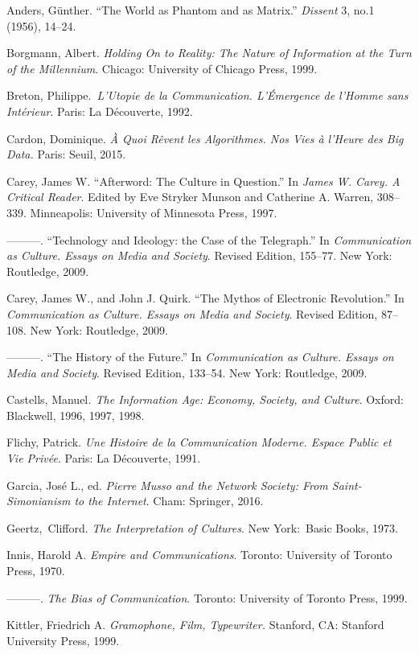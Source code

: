 \documentclass{tufte-handout}
\begin{document}
\begin{hangparas}{.25in}{1} 



Anders, Günther. ``The World as Phantom and as Matrix.'' \emph{Dissent}
3, no.1 (1956), 14--24.

Borgmann, Albert. \emph{Holding On to Reality: The Nature of Information
at the Turn of the Millennium}. Chicago: University of Chicago Press,
1999.

Breton, Philippe.~\emph{L'Utopie de la Communication. L'Émergence de
l'Homme sans Intérieur}. Paris: La Découverte, 1992.

Cardon, Dominique. \emph{À Quoi Rêvent les Algorithmes. Nos Vies à
l'Heure des Big Data.} Paris: Seuil, 2015.

Carey, James W. ``Afterword: The Culture in Question.'' In \emph{James
W. Carey. A Critical Reader}. Edited by Eve Stryker Munson and Catherine
A. Warren, 308--339. Minneapolis: University of Minnesota Press, 1997.

---------. ``Technology and Ideology: the Case of the Telegraph.'' In
\emph{Communication as Culture. Essays on Media and Society}. Revised
Edition, 155--77. New York: Routledge, 2009.

Carey, James W., and John J. Quirk. ``The Mythos of Electronic
Revolution.'' In \emph{Communication as Culture. Essays on Media and
Society}. Revised Edition, 87--108. New York: Routledge, 2009.

---------. ``The History of the Future.'' In \emph{Communication as
Culture. Essays on Media and Society}. Revised Edition, 133--54. New
York: Routledge, 2009.

Castells, Manuel\emph{. The Information Age: Economy, Society, and
Culture}. Oxford: Blackwell, 1996, 1997, 1998.

Flichy, Patrick. \emph{Une Histoire de la Communication Moderne. Espace
Public et Vie Privée}. Paris: La Découverte, 1991.

Garcia, José L., ed. \emph{Pierre Musso and the Network Society: From
Saint-Simonianism to the Internet}. Cham: Springer, 2016.

Geertz,~Clifford. \emph{The Interpretation of Cultures}. New York:~Basic
Books, 1973.

Innis, Harold A. \emph{Empire and Communications}. Toronto: University
of Toronto Press, 1970.

---------. \emph{The Bias of Communication}. Toronto: University of
Toronto Press, 1999.

Kittler, Friedrich A. \emph{Gramophone, Film, Typewriter.} Stanford, CA:
Stanford University Press, 1999.


\end{hangparas}
\end{document}
